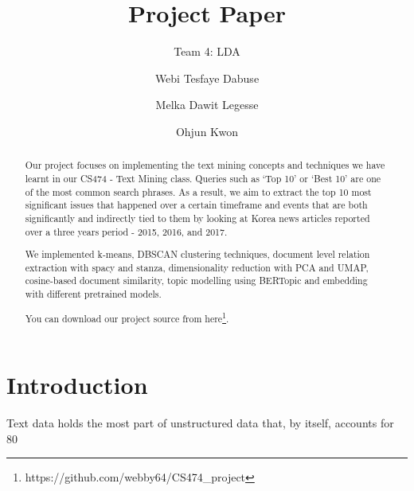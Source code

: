 \documentclass[sigconf,authorversion,nonacm]{acmart}
\begin{document}
\title{Project Paper}
\subtitle{Team 4: LDA}

\author{Webi Tesfaye Dabuse}

\author{Melka Dawit Legesse}

\author{Ohjun Kwon}

\begin{abstract}
    Our project focuses on implementing the text mining concepts and techniques we have learnt in our CS474 - Text Mining class. Queries such as ‘Top 10’ or ‘Best 10’ are one of the most common search phrases. As a result, we aim to extract the top 10 most significant issues that happened over a certain timeframe  and events that are both significantly and indirectly tied to them by looking at Korea news articles reported over a three years period - 2015, 2016, and 2017.

    We implemented k-means, DBSCAN clustering techniques, document level relation extraction with spacy and stanza, dimensionality reduction with PCA and UMAP, cosine-based document similarity, topic modelling using BERTopic and embedding with different pretrained models.

    You can download our project source from here\footnote{https://github.com/webby64/CS474\_project}.
\end{abstract}

\maketitle
\section{Introduction}
Text data holds the most part of unstructured data that, by itself,  accounts for 80%
\end{document}
